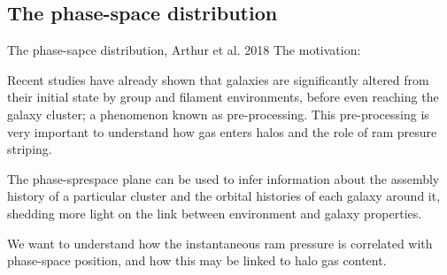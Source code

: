 \documentclass[aspectratio=43]{beamer}
\begin{document}
\subsection{The phase-space distribution}\label{Arthur}
\begin{frame}{The phase-sapce distribution, Arthur et al. 2018}
The motivation: 

Recent studies have already shown that galaxies are significantly altered from their initial state by group and filament environments, before even reaching the galaxy cluster; a phenomenon known as \alert{pre-processing}. This pre-processing is very important to understand how gas enters halos and the role of \alert{ram presure striping}.

The \alert{phase-sprespace} plane can be used to infer information about the assembly history of a particular cluster and the orbital histories of each galaxy around it, shedding more light on the link between environment and galaxy properties. 

We want to understand how the instantaneous ram pressure is correlated with phase-space position, and how this may be linked to halo gas content.
\end{frame}
\end{document}
